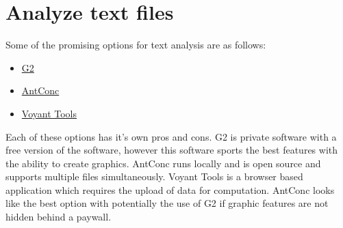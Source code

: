 \documentclass{article}
\begin{document}
\section{Analyze text files}
Some of the promising options for text analysis are as follows:
\begin{itemize}
    \item \hyperlink{https://www.g2.com/categories/text-analysis}{G2}
    \item \hyperlink{https://www.laurenceanthony.net/software/antconc/}{AntConc}
    \item \hyperlink{Voyant-tools.org}{Voyant Tools}
\end{itemize}

\noindent 
Each of these options has it's own pros and cons. G2 is private software with a free version of the software, however this software sports the best features with the ability to create graphics. AntConc runs locally and is open source and supports multiple files simultaneously. Voyant Tools is a browser based application which requires the upload of data for computation. AntConc looks like the best option with potentially the use of G2 if graphic features are not hidden behind a paywall.
\
\end{document}
